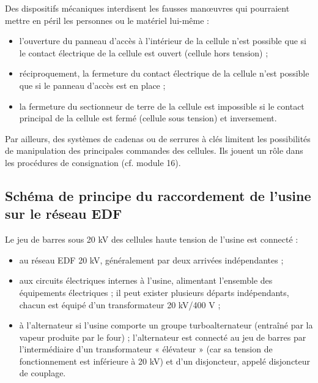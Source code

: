Des dispositifs mécaniques interdisent les fausses manœuvres qui pourraient mettre en péril les personnes ou le matériel lui-même :
\begin{itemize}
\item l’ouverture du panneau d’accès à l’intérieur de la cellule n’est possible que si le contact électrique de la cellule est ouvert (cellule hors tension) ;
\item réciproquement, la fermeture du contact électrique de la cellule n’est possible que si le panneau d’accès est en place ;
\item la fermeture du sectionneur de terre de la cellule est impossible si le contact principal de la cellule est fermé (cellule sous tension) et inversement.
\end{itemize}
Par ailleurs, des systèmes de cadenas ou de serrures à clés limitent les possibilités de manipulation des principales commandes des cellules. Ils jouent un rôle dans les procédures de consignation (cf. module 16).

\subsection{Schéma de principe du raccordement de l’usine sur le réseau EDF}

Le jeu de barres sous 20 kV des cellules haute tension de l’usine est connecté :

\begin{itemize}
\item au réseau EDF 20 kV, généralement par deux arrivées indépendantes ;
\item aux circuits électriques internes à l’usine, alimentant l’ensemble des équipements électriques ; il peut exister plusieurs départs indépendants, chacun est équipé d’un transformateur 20 kV/400 V ;
\item à l’alternateur si l’usine comporte un groupe turboalternateur (entraîné par la vapeur produite par le four) ; l’alternateur est connecté au jeu de barres par l’intermédiaire d’un transformateur « élévateur » (car sa tension de fonctionnement est inférieure à 20 kV) et d’un disjoncteur, appelé disjoncteur de couplage.
\end{itemize}

